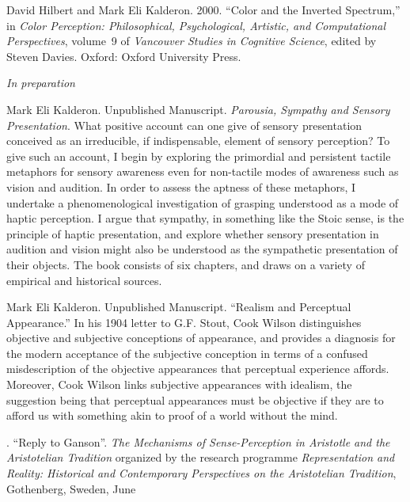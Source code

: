 \documentclass[11pt]{article}
\begin{document}
\ind David Hilbert and Mark Eli Kalderon. 2000. ``Color and the Inverted Spectrum,'' in \emph{Color Perception: Philosophical, Psychological, Artistic, and Computational Perspectives}, volume~9 of \emph{Vancouver Studies in Cognitive Science}, edited by Steven Davies. Oxford: Oxford University Press.


\bigskip 

 
\noindent\emph{In preparation \vspace{0.05in}}


\ind Mark Eli Kalderon. Unpublished Manuscript. \emph{\emph{Parousia}, Sympathy and Sensory Presentation}. What positive account can one give of sensory presentation conceived as an irreducible, if indispensable, element of sensory perception? To give such an account, I begin by exploring the primordial and persistent tactile metaphors for sensory awareness even for non-tactile modes of awareness such as vision and audition. In order to assess the aptness of these metaphors, I undertake a phenomenological investigation of grasping understood as a mode of haptic perception. I argue that sympathy, in something like the Stoic sense, is the principle of haptic presentation, and explore whether sensory presentation in audition and vision might also be understood as the sympathetic presentation of their objects. The book consists of six chapters, and draws on a variety of empirical and historical sources.

\ind Mark Eli Kalderon. Unpublished Manuscript. ``Realism and Perceptual Appearance.'' In his 1904 letter to G.F. Stout, Cook Wilson distinguishes objective and subjective conceptions of appearance, and provides a diagnosis for the modern acceptance of the subjective conception in terms of a confused misdescription of the objective appearances that perceptual experience affords. Moreover, Cook Wilson links subjective appearances with idealism, the suggestion being that perceptual appearances must be objective if they are to afford us with something akin to proof of a world without the mind.

 \bigskip

\medskip

. ``Reply to Ganson''. \emph{The Mechanisms of Sense-Perception in Aristotle and the Aristotelian Tradition} organized by the research programme
\emph{Representation and Reality: Historical and Contemporary Perspectives on the Aristotelian Tradition}, Gothenberg, Sweden, June
\end{document}
